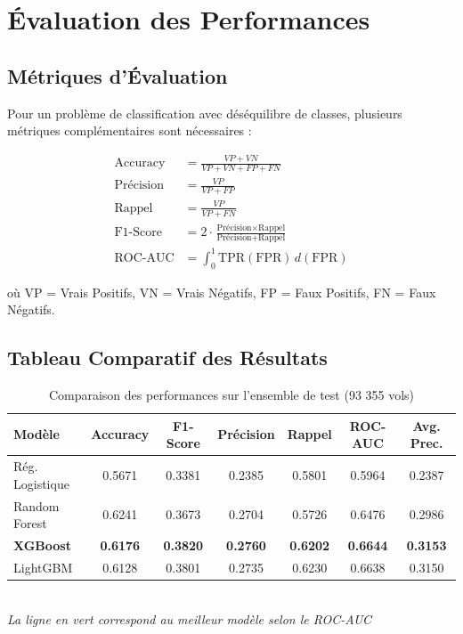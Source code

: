 \documentclass[12pt,a4paper]{article}
\begin{document}
\newpage
\section{Évaluation des Performances}

\subsection{Métriques d'Évaluation}

Pour un problème de classification avec déséquilibre de classes, plusieurs métriques 
complémentaires sont nécessaires :

\begin{align}
  \text{Accuracy} &= \frac{VP + VN}{VP + VN + FP + FN} \\[6pt]
  \text{Précision} &= \frac{VP}{VP + FP} \\[6pt]
  \text{Rappel} &= \frac{VP}{VP + FN} \\[6pt]
  \text{F1-Score} &= 2 \cdot \frac{\text{Précision} \times \text{Rappel}}{\text{Précision} + \text{Rappel}} \\[6pt]
  \text{ROC-AUC} &= \int_0^1 \text{TPR}(\text{FPR})\, d(\text{FPR})
\end{align}

où VP = Vrais Positifs, VN = Vrais Négatifs, FP = Faux Positifs, FN = Faux Négatifs.

\subsection{Tableau Comparatif des Résultats}

\begin{table}[H]
  \centering
  \caption{Comparaison des performances sur l'ensemble de test (93 355 vols)}
  \setlength{\tabcolsep}{8pt}
  \begin{tabular}{lcccccc}
    \toprule
    \textbf{Modèle} & \textbf{Accuracy} & \textbf{F1-Score} & \textbf{Précision} & \textbf{Rappel} & \textbf{ROC-AUC} & \textbf{Avg. Prec.} \\
    \midrule
    Rég. Logistique  & 0.5671 & 0.3381 & 0.2385 & 0.5801 & 0.5964 & 0.2387 \\
    Random Forest    & 0.6241 & 0.3673 & 0.2704 & 0.5726 & 0.6476 & 0.2986 \\
    \rowcolor{best}
    \textbf{XGBoost} & \textbf{0.6176} & \textbf{0.3820} & \textbf{0.2760} & \textbf{0.6202} & \textbf{0.6644} & \textbf{0.3153} \\
    LightGBM         & 0.6128 & 0.3801 & 0.2735 & 0.6230 & 0.6638 & 0.3150 \\
    \bottomrule
  \end{tabular}
  \\\vspace{4pt}
  \small \textit{La ligne en vert correspond au meilleur modèle selon le ROC-AUC}
\end{table}
\end{document}
